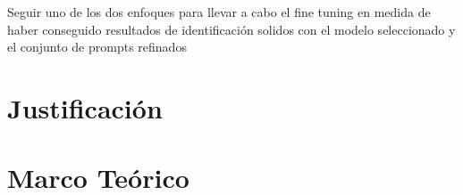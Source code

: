 \documentclass{article}
\begin{document}


Seguir uno de los dos enfoques para llevar a cabo el fine tuning en medida de haber conseguido resultados de identificaci{\'{o}}n solidos con el modelo seleccionado y el conjunto de prompts refinados





\section{\label{ref-005}Justificaci{\'{o}}n}




\section{\label{ref-006}Marco Teórico}

\end{document}
